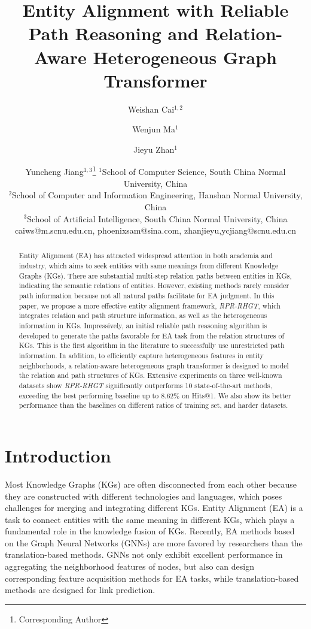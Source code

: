 \documentclass{article}
\title{
Entity Alignment with Reliable Path Reasoning and Relation-Aware Heterogeneous Graph Transformer
}
\author{
	Weishan Cai$^{1,2}$\and
	Wenjun Ma$^1$\and
	Jieyu Zhan$^1$\and
	Yuncheng Jiang$^{1,3}$\footnote{Corresponding Author}
\affiliations
$^1$School of Computer Science, South China Normal University, China\\
$^2$School of Computer and Information Engineering, Hanshan Normal University, China\\
$^3$School of Artificial Intelligence, South China Normal University, China
\emails
	caiws@m.scnu.edu.cn,
	phoenixsam@sina.com,
	zhanjieyu,ycjiang@scnu.edu.cn
}
\begin{document}
\maketitle
\begin{abstract}
	Entity Alignment (EA) has attracted widespread attention in both academia and industry, which aims to seek entities with same meanings from different Knowledge Graphs (KGs). 
	There are substantial multi-step relation paths between entities in KGs, indicating the semantic relations of entities. 
	However, existing methods rarely consider path information because not all natural paths facilitate for EA judgment. 
	In this paper, we propose a more effective entity alignment framework, \textit{RPR-RHGT}, which integrates relation and path structure information, as well as the heterogeneous information in KGs. 
	Impressively, an initial reliable path reasoning algorithm is developed to generate the paths favorable for EA task from the relation structures of KGs.
	This is the first algorithm in the literature to successfully use unrestricted path information. 
	In addition, to efficiently capture heterogeneous features in entity neighborhoods, a relation-aware heterogeneous graph transformer is designed to model the relation and path structures of KGs. 
	Extensive experiments on three well-known datasets show \textit{RPR-RHGT} significantly outperforms 10 state-of-the-art methods, exceeding the best performing baseline up to 8.62\% on Hits@1. 
	We also show its better performance than the baselines on different ratios of training set, and harder datasets.
\end{abstract}

%
\section{Introduction}
\label{sec1}

Most Knowledge Graphs (KGs) are often disconnected from each other because they are constructed with different technologies and languages, which poses challenges for merging and integrating different KGs.
Entity Alignment (EA) is a task to connect entities with the same meaning in different KGs, which plays a fundamental role in the knowledge fusion of KGs.
Recently, EA methods based on the Graph Neural Networks (GNNs) are more favored by researchers than the translation-based methods.
GNNs not only exhibit excellent performance in aggregating the neighborhood features of nodes, but also can design corresponding feature acquisition methods for EA tasks, while translation-based methods are designed for link prediction.
\end{document}
